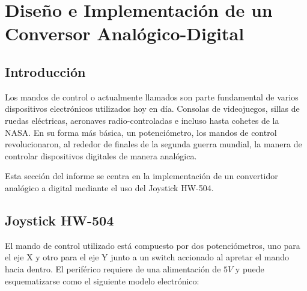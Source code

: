



\tableofcontents
\newpage
\section{Diseño e Implementación de un Conversor Analógico-Digital}

\subsection{Introducción}

Los mandos de control o actualmente llamados  son parte fundamental de varios dispositivos electrónicos utilizados hoy en día. Consolas de videojuegos, sillas de ruedas eléctricas, aeronaves radio-controladas e incluso hasta cohetes de la NASA. En su forma más básica, un potenciómetro, los mandos de control revolucionaron, al rededor de finales de la segunda guerra mundial, la manera de controlar dispositivos digitales de manera analógica. 

Esta sección del informe se centra en la implementación de un convertidor analógico a digital mediante el uso del Joystick HW-504.

\subsection{Joystick HW-504}

El mando de control utilizado está compuesto por dos potenciómetros, uno para el eje X y otro para el eje Y junto a un switch accionado al apretar el mando hacia dentro. El periférico requiere de una alimentación de $5V$ y puede esquematizarse como el siguiente modelo electrónico:

